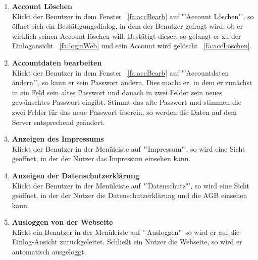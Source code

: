 \begin{enumerate}
\item \label{fa:accLöschenWeb}\textbf{Account Löschen} \hfill \\
Klickt der Benutzer in dem Fenster ~\eqref{fa:accBearb} auf "'Account Löschen"', so öffnet sich ein Bestätigungsdialog, in dem der Benutzer gefragt wird, ob er wirklich seinen Account löschen will. Bestätigt dieser, so gelangt er zu der Einlogansicht ~\eqref{fa:loginWeb} und sein Account wird gelöscht ~\eqref{fa:accLöschen}.

\item \label{fa:accDatBearb}\textbf{Accountdaten bearbeiten} \hfill \\
Klickt der Benutzer in dem Fenster ~\eqref{fa:accBearb} auf "'Accountdaten ändern"', so kann er sein Passwort ändern. Dies macht er, in dem er zunächst in ein Feld sein altes Passwort und danach in zwei Felder sein neues gewünschtes Passwort eingibt. Stimmt das alte Passwort und stimmen die zwei Felder für das neue Passwort überein, so werden die Daten auf dem Server entsprechend geändert.

\item \label{fa:impressumWeb} \textbf{Anzeigen des Impressums} \hfill \\
Klickt der Benutzer in der Menüleiste auf "'Impressum"', so wird eine Sicht geöffnet, in der der Nutzer das Impressum einsehen kann.

\item \label{fa:datenschutzWeb} \textbf{Anzeigen der Datenschutzerklärung} \hfill \\
Klickt der Benutzer in der Menüleiste auf "'Datenschutz"', so wird eine Sicht geöffnet, in der der Nutzer die Datenschutzerklärung und die AGB einsehen kann.

\item \label{fa:weblogOut}\textbf{Ausloggen von der Webseite} \hfill \\
Klickt ein Benutzer in der Menüleiste auf "'Ausloggen"' so wird er auf die Einlog-Ansicht zurückgeleitet. Schließt ein Nutzer die Webseite, so wird er automatisch ausgeloggt.

\end{enumerate}